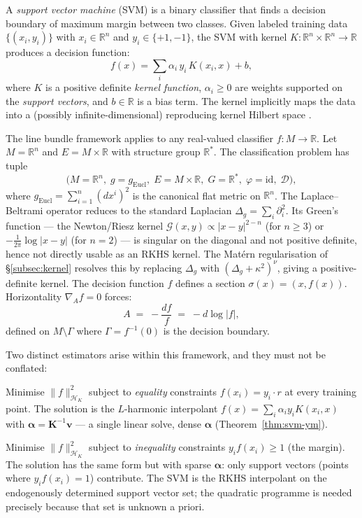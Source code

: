 \documentclass[11pt, a4paper]{article}
\theoremstyle{plain}
\theoremstyle{definition}
\newcommand{\R}{\mathbb{R}}
\newcommand{\Gam}{\Gamma}
\newcommand{\Gr}{\mathcal{G}}   %
\begin{document}
A \emph{support vector machine} (SVM) \cite{scholkopf2002} is a binary classifier that finds a
decision boundary of maximum margin between two classes. Given labeled training
data $\{(x_i, y_i)\}$ with $x_i \in \R^n$ and $y_i \in \{+1,-1\}$, the SVM
with kernel $K: \R^n \times \R^n \to \R$ produces a decision function:
\[
  f(x) = \sum_i \alpha_i\,y_i\,K(x_i, x) + b,
\]
where $K$ is a positive definite \emph{kernel function}, $\alpha_i \geq 0$ are
weights supported on the \emph{support vectors}, and $b \in \R$ is a bias term.
The kernel implicitly maps the data into a (possibly infinite-dimensional)
reproducing kernel Hilbert space \cite{scholkopf2002}.

The line bundle framework applies to any real-valued classifier $f: M \to \R$.
Let $M = \R^n$ and $E = M \times \R$ with structure group $\R^*$. The
classification problem has tuple
\[
  \bigl(M = \R^n,\; g = g_{\mathrm{Eucl}},\; E = M\times\R,\;
        G = \R^*,\; \varphi = \mathrm{id},\; \mathcal{D}\bigr),
\]
where $g_{\mathrm{Eucl}} = \sum_{i=1}^n(dx^i)^2$ is the canonical flat metric on
$\R^n$. The Laplace--Beltrami operator reduces to the standard Laplacian
$\Delta_g = \sum_i\partial_i^2$. Its Green's function --- the Newton/Riesz kernel
$\Gr(x,y) \propto |x-y|^{2-n}$ (for $n \geq 3$) or $-\frac{1}{2\pi}\log|x-y|$
(for $n=2$) --- is singular on the diagonal and not positive definite, hence not
directly usable as an RKHS kernel. The Matérn regularisation of
\S\ref{subsec:kernel} resolves this by replacing $\Delta_g$ with
$(\Delta_g + \kappa^2)^\nu$, giving a positive-definite kernel. The decision
function $f$ defines a section $\sigma(x) = (x, f(x))$. Horizontality
$\nabla_A f = 0$ forces:
\begin{equation}\label{eq:svm-conn}
  A \;=\; -\frac{df}{f} \;=\; -d\log|f|,
\end{equation}
defined on $M\setminus\Gam$ where $\Gam = f^{-1}(0)$ is the decision boundary.

Two distinct estimators arise within this framework, and they must not be
conflated:

\begin{description}[itemsep=4pt]
\item[RKHS interpolation.] Minimise $\|f\|^2_{\mathcal{H}_K}$ subject to
  \emph{equality} constraints $f(x_i) = y_i \cdot r$ at every training point.
  The solution is the $L$-harmonic interpolant $f(x) = \sum_i \alpha_i y_i K(x_i,x)$
  with $\boldsymbol{\alpha} = \mathbf{K}^{-1}\mathbf{v}$ — a single linear solve,
  dense $\boldsymbol{\alpha}$ (Theorem~\ref{thm:svm-ym}).
\item[Hard-margin SVM.] Minimise $\|f\|^2_{\mathcal{H}_K}$ subject to
  \emph{inequality} constraints $y_i f(x_i) \geq 1$ (the margin).
  The solution has the same form but with sparse $\boldsymbol{\alpha}$: only
  support vectors (points where $y_i f(x_i) = 1$) contribute.
  The SVM is the RKHS interpolant on the endogenously determined support vector
  set; the quadratic programme is needed precisely because that set is unknown
  a priori.
\end{description}
\end{document}
